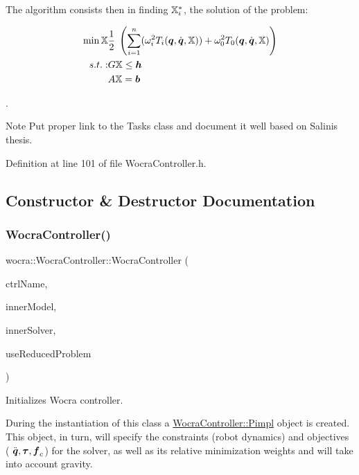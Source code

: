 The algorithm consists then in finding $\mathbb{X}_i^*$, the solution of the problem\+:

\begin{align*} \min{\mathbb{X}} & \frac{1}{2} \; \left( \sum_{i=1}^{n} (\omega_i^2 T_i (\mbox{\boldmath${q}$}, \dot{\mbox{\boldmath${q}$}}, \mathbb{X})) + \omega_0^2 T_0(\mbox{\boldmath${q}$}, \dot{\mbox{\boldmath${q}$}}, \mathbb{X}) \right) \\ s.t.: & G \mathbb{X} \leq \mbox{\boldmath${h}$} \\ & A \mathbb{X} = \mbox{\boldmath${b}$} \end{align*}

\cite{salini2012Thesis}.

\begin{DoxyNote}{Note}
Put proper link to the Tasks class and document it well based on Salini\textquotesingle{}s thesis. 
\end{DoxyNote}


Definition at line 101 of file Wocra\+Controller.\+h.



\subsection{Constructor \& Destructor Documentation}
\hypertarget{classwocra_1_1WocraController_ae14fda387f6d308aead6ab7a59e82e74}{}\label{classwocra_1_1WocraController_ae14fda387f6d308aead6ab7a59e82e74} 
\subsubsection{\texorpdfstring{Wocra\+Controller()}{WocraController()}}
{\footnotesize\ttfamily wocra\+::\+Wocra\+Controller\+::\+Wocra\+Controller (\begin{DoxyParamCaption}\item[{const std\+::string \&}]{ctrl\+Name,  }\item[{std\+::shared\+\_\+ptr$<$ Model $>$}]{inner\+Model,  }\item[{std\+::shared\+\_\+ptr$<$ \hyperlink{classocra_1_1OneLevelSolver}{One\+Level\+Solver} $>$}]{inner\+Solver,  }\item[{bool}]{use\+Reduced\+Problem }\end{DoxyParamCaption})}

Initializes Wocra controller.

During the instantiation of this class a \hyperlink{structwocra_1_1WocraController_1_1Pimpl}{Wocra\+Controller\+::\+Pimpl} object is created. This object, in turn, will specify the constraints (robot dynamics) and objectives ( $ \ddot{\mbox{\boldmath${q}$}}, \mbox{\boldmath${\tau}$}, \mbox{\boldmath${f}$}_c $) for the solver, as well as its relative minimization weights and will take into account gravity.


